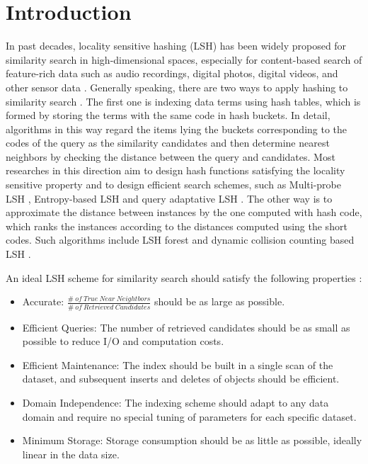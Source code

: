 \section{Introduction}
In past decades, locality sensitive hashing (LSH) has been widely proposed for similarity search in high-dimensional spaces, especially for content-based search of feature-rich data such as audio recordings, digital photos, digital videos, and other sensor data \cite{lv2007multi}. Generally speaking, there are two ways to apply hashing to similarity search \cite{wang2014hashing}. The first one is indexing data terms using hash tables, which is formed by storing the terms with the same code in hash buckets. In detail, algorithms in this way regard the items lying the buckets corresponding to the codes of the query as the similarity candidates and then determine nearest neighbors by checking the distance between the query and candidates. Most researches in this direction aim to design hash functions satisfying the locality sensitive property and to design efficient search schemes, such as Multi-probe LSH \cite{lv2007multi}, Entropy-based LSH \cite{panigrahy2006entropy} and query adaptative LSH \cite{jegou2008query}. The other way is to approximate the distance between instances by the one computed with hash code, which ranks the instances according to the distances computed using the short codes. Such algorithms include LSH forest \cite{bawa2005lsh} and dynamic collision counting based LSH \cite{gan2012locality}.

An ideal LSH scheme for similarity search should satisfy the following properties \cite{bawa2005lsh, lv2007multi}:

\begin{itemize}
	\item Accurate: $\frac{\#\ of\ True\ Near\ Neightbors}{\#\ of\ Retrieved\ Candidates}$ should be as large as possible.
	\item {Efficient Queries}: The number of retrieved candidates should be as small as possible to reduce I/O and computation costs.
	\item {Efficient Maintenance}: The index should be built in a single scan of the dataset, and subsequent inserts and deletes of objects should be efficient.
	\item  {Domain Independence}: The indexing scheme should adapt to any data domain and require no special tuning of parameters for each specific dataset.
	\item  {Minimum Storage}: Storage consumption should be as little as possible, ideally linear in the data size.
\end{itemize}